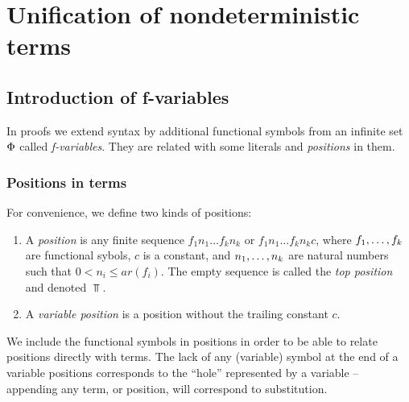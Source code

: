 \section{Unification of nondeterministic terms}\label{se:unification}

\subsection{Introduction of f-variables}

In proofs we extend syntax by additional functional symbols from an infinite
set \(\Fvars\) called {\em f-variables}.  They are related with some literals
and {\em positions} in them. 

\subsubsection{Positions in terms}
%
%
\begin{definition}\label {def:position}
For convenience, we define two kinds of positions:
\begin{enumerate}\smallerspaces
\item A {\em position} is any finite sequence \(f_1n_1\ldots f_kn_k\) or
\(f_1n_1\ldots f_kn_kc\), where \(\List fk,\) are functional sybols, $c$ is a
constant, and \(\List nk,\) are natural numbers such that \(0< n_i\leq
ar(f_i)\).  The empty sequence is called the {\em top position} and denoted
\(\Top\).
\item A {\em variable position} is a position without the trailing constant $c$.
\end{enumerate}
\end{definition}
We include the functional symbols in positions in order to be able to relate
positions directly with terms. The lack of any (variable) symbol at the 
end of a variable positions corresponds to the ``hole'' represented by a variable
-- appending any term, or position, will correspond to substitution.

